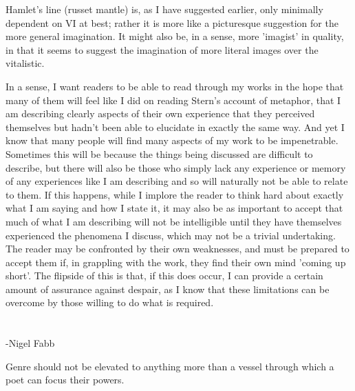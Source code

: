 \documentclass[]{article}
\begin{document}
Hamlet's line (russet mantle) is, as I have suggested earlier, only minimally dependent on VI at best; rather it is more like a picturesque suggestion for the more general imagination. It might also be, in a sense, more 'imagist' in quality, in that it seems to suggest the imagination of more literal images over the vitalistic.



In a sense, I want readers to be able to read through my works in the hope that many of them will feel like I did on reading Stern's account of metaphor, that I am describing clearly aspects of their own experience that they perceived themselves but hadn't been able to elucidate in exactly the same way. And yet I know that many people will find many aspects of my work to be impenetrable. Sometimes this will be because the things being discussed are difficult to describe, but there will also be those who simply lack any experience or memory of any experiences like I am describing and so will naturally not be able to relate to them. If this happens, while I implore the reader to think hard about exactly what I am saying and how I state it, it may also be as important to accept that much of what I am describing will not be intelligible until they have themselves experienced the phenomena I discuss, which may not be a trivial undertaking. The reader may be confronted by their own weaknesses, and must be prepared to accept them if, in grappling with the work, they find their own mind 'coming up short'. The flipside of this is that, if this does occur, I can provide a certain amount of assurance against despair, as I know that these limitations can be overcome by those willing to do what is required.



\section{}



-Nigel Fabb



Genre should not be elevated to anything more than a vessel through which a poet can focus their powers.



\section{}
\end{document}
